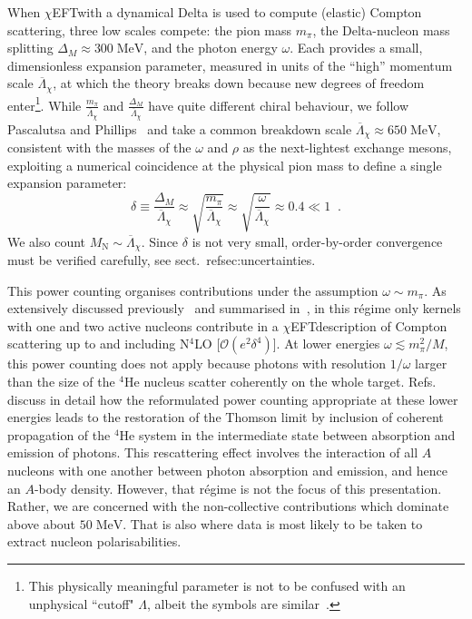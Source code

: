 \documentclass[12pt]{article}
\newcommand{\ChiEFT}{$\chi$EFT\;}
\newcommand{\fourHe}{${}^{4} \mathrm{He}$\xspace}
\newcommand{\MeV}{\mathrm{MeV}}
\newcommand{\3}{\ss}
\newcommand{\mpi}{\ensuremath{m_\pi}}
\newcommand{\NXLO}[1]{N\ensuremath{{}^{#1}}LO\xspace}
\newcommand{\MN}{\ensuremath{M_\mathrm{N}}} %
\newcommand{\DeltaM}{\ensuremath{\Delta_{\scriptscriptstyle M}}} %
\newcommand{\Lambdachi}{\overline{\Lambda}_\chi}
\newcommand{\calO}{\mathcal{O}} \newcommand{\calP}{\mathcal{P}}
\numberwithin{equation}{section}
\begin{document}
When \ChiEFT with a dynamical Delta is used to compute (elastic)
Compton scattering, three low
scales compete: the pion mass $\mpi$, the Delta-nucleon mass splitting
$\DeltaM \approx 300\;\MeV$, and the photon energy $\omega$.  Each provides a
small, dimensionless expansion parameter, measured in units of the
``high'' momentum
scale $\Lambdachi$, at which the theory breaks down because new degrees of
freedom enter\footnote{This physically meaningful parameter is not to
  be confused with an unphysical ``cutoff" $\Lambda$, albeit the
symbols are similar~\cite{Furnstahl:2014xsa,Griesshammer:2021zzz}.}.
While $\frac{\mpi}{\Lambdachi}$ and
$\frac{\DeltaM}{\Lambdachi}$ have quite different chiral behaviour, we follow
Pascalutsa and Phillips~\cite{Pascalutsa:2002pi} and take a common breakdown
scale $\Lambdachi \approx 650\;\MeV$, consistent with the masses of the
$\omega$ and $\rho$ as the next-lightest exchange mesons, exploiting a
numerical coincidence at the physical pion mass to define a single
expansion parameter:
\begin{equation}
  \delta\equiv\frac{\Delta_M}{\Lambdachi}\approx \sqrt{\frac{m_\pi}{\Lambdachi}}
  \approx\sqrt{\frac{\omega}{\Lambdachi}}\approx 0.4\ll1\;\;.
\end{equation}
We also count $\MN\sim\Lambdachi$.  Since $\delta$ is not very small,
order-by-order convergence must be verified carefully, see
sect.~refsec:uncertainties.

This power counting organises contributions under the assumption
$\omega\sim\mpi$.
As extensively discussed previously~\cite{Beane:1999uq,
Beane:2004ra,Hildebrandt:2005ix, Hildebrandt:2005iw, Margaryan:2018opu} and
summarised in~\cite[sect.~5.2]{Griesshammer:2012we}, in this r\'egime
only kernels with one and
two active nucleons contribute in a \ChiEFT description of Compton
scattering up to and including
\NXLO{4} [$\calO(e^2\delta^4)$].
At lower energies $\omega \lesssim m_\pi^2/M$, this power counting
does not apply because photons with resolution $1/\omega$
larger than the size of the \fourHe nucleus scatter coherently on the whole
target.  Refs.~\cite{Hildebrandt:2005ix, Hildebrandt:2005iw,
Griesshammer:2012we} discuss in detail how the reformulated power
counting appropriate at these lower energies leads to the restoration of
the Thomson limit by inclusion of coherent propagation of the \fourHe system
in the intermediate state between absorption and emission of photons. This
rescattering effect involves the interaction of all $A$ nucleons with one
another between photon absorption and emission, and hence an $A$-body
density. However, that r\'egime is not the focus of this
presentation. Rather, we are
concerned with the non-collective contributions which dominate above about
$50\;\MeV$. That is also where data is most likely to be taken to extract
nucleon polarisabilities.
\end{document}
